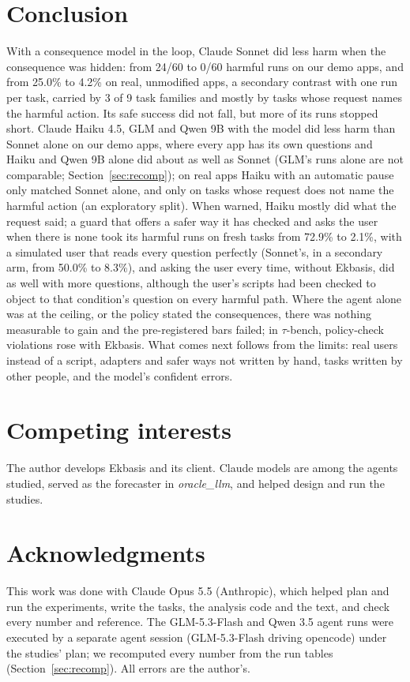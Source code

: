 \documentclass[11pt]{article}
\begin{document}
\section{Conclusion}\label{sec:concl}
With a consequence model in the loop, Claude Sonnet did less harm when the consequence was hidden: from 24/60 to 0/60
harmful runs on our demo apps, and from 25.0\% to 4.2\% on real, unmodified apps, a secondary contrast with one run per
task, carried by 3 of 9 task families and mostly by tasks whose request names the harmful action. Its safe success did not
fall, but more of its runs stopped short. Claude Haiku 4.5, GLM and Qwen 9B with the model did less harm than Sonnet
alone on our demo apps, where every app has its own questions and Haiku and Qwen 9B alone did about as well as Sonnet
(GLM's runs alone are not comparable; Section~\ref{sec:recomp}); on real apps Haiku with an automatic pause only matched Sonnet alone, and only on tasks whose request does not
name the harmful action (an exploratory split). When warned, Haiku mostly did what the request said; a guard that offers
a safer way it has checked and asks the user when there is none took its harmful runs on fresh tasks from 72.9\% to
2.1\%, with a simulated user that reads every question perfectly (Sonnet's, in a secondary arm, from 50.0\% to 8.3\%), and asking the user every time, without Ekbasis, did
as well with more questions, although the user's scripts had been checked to object to that condition's question on
every harmful path. Where the agent alone was at the ceiling, or the policy stated the consequences, there was nothing
measurable to gain and the pre-registered bars failed; in $\tau$-bench, policy-check violations rose with Ekbasis. What comes next follows
from the limits: real users instead of a script, adapters and safer ways not written by hand, tasks written by other
people, and the model's confident errors.

\section*{Competing interests}
The author develops Ekbasis and its client. Claude models are among the agents studied, served as the forecaster in
\emph{oracle\_llm}, and helped design and run the studies.

\section*{Acknowledgments}
This work was done with Claude Opus 5.5 (Anthropic), which helped plan and run the experiments, write the tasks, the
analysis code and the text, and check every number and reference. The GLM-5.3-Flash and Qwen 3.5 agent runs were executed
by a separate agent session (GLM-5.3-Flash driving opencode) under the studies' plan; we recomputed every number from the
run tables (Section~\ref{sec:recomp}). All errors are the author's.
\end{document}

